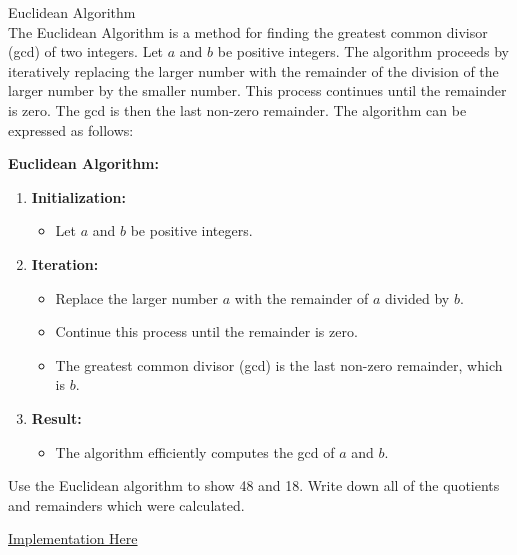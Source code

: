 \newpage
\begin{thm}{Euclidean Algorithm}$ $\\
The Euclidean Algorithm is a method for finding the greatest common divisor (gcd) of two integers. Let $a$ and $b$ be positive integers. The algorithm proceeds by iteratively replacing the larger number with the remainder of the division of the larger number by the smaller number. This process continues until the remainder is zero. The gcd is then the last non-zero remainder. The algorithm can be expressed as follows:

\textbf{Euclidean Algorithm:}

\begin{enumerate}
  \item \textbf{Initialization:}
    \begin{itemize}
      \item Let $a$ and $b$ be positive integers.
    \end{itemize}
  
  \item \textbf{Iteration:}
    \begin{itemize}
      \item Replace the larger number $a$ with the remainder of $a$ divided by $b$.
      \item Continue this process until the remainder is zero.
      \item The greatest common divisor (gcd) is the last non-zero remainder, which is $b$.
    \end{itemize}
  
  \item \textbf{Result:}
    \begin{itemize}
      \item The algorithm efficiently computes the gcd of $a$ and $b$.
    \end{itemize}
\end{enumerate}

\end{thm}
\begin{exmp}Use the Euclidean algorithm to show 48 and 
18. Write down all of the quotients and remainders which were calculated.
\vspace{3cm}
\end{exmp}
\href{https://pythontutor.com/render.html#code=def%20euclidean_algorithm%28a,%20b%29%3A%0A%20%20%20%20while%20b%20!%3D%200%3A%0A%20%20%20%20%20%20%20%20print%28f%22%7Ba%7D%3D%7Bb%7Dx%7Ba//b%7D%2B%7Ba%25b%7D%22%29%0A%20%20%20%20%20%20%20%20a,%20b%20%3D%20b,%20a%20%25%20b%0A%20%20%20%20return%20a%0A%0A%23%20Example%20usage%3A%0Anum1%20%3D%2048%0Anum2%20%3D%2018%0Aresult%20%3D%20euclidean_algorithm%28num1,%20num2%29%0A%0Aprint%28f%22The%20gcd%20of%20%7Bnum1%7D%20and%20%7Bnum2%7D%20is%3A%20%7Bresult%7D%22%29&cumulative=true&curInstr=18&heapPrimitives=nevernest&mode=display&origin=opt-frontend.js&py=3&rawInputLstJSON=%5B%5D&textReferences=false}{Implementation Here}
